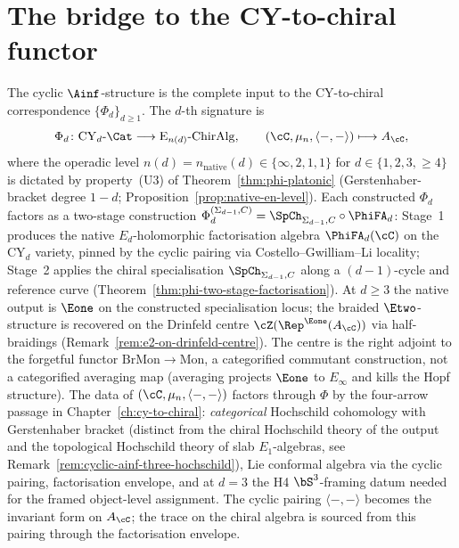 \section{The bridge to the CY-to-chiral functor}
\label{sec:bridge-to-functor}

The cyclic $\Ainf$-structure is the complete input to the CY-to-chiral correspondence $\{\Phi_d\}_{d \geq 1}$. The $d$-th signature is
\[
 \Phi_d \colon \mathrm{CY}_d\text{-}\Cat \longrightarrow \mathrm{E}_{n(d)}\text{-}\mathrm{ChirAlg},
 \qquad (\cC, \mu_n, \langle-,-\rangle) \longmapsto A_\cC,
\]
where the operadic level $n(d) = n_{\mathrm{native}}(d) \in \{\infty, 2, 1, 1\}$ for $d \in \{1, 2, 3, \geq 4\}$ is dictated by property~\textup{(U3)} of Theorem~\textup{\ref{thm:phi-platonic}} (Gerstenhaber-bracket degree $1 - d$; Proposition~\ref{prop:native-en-level}). Each constructed $\Phi_d$ factors as a two-stage construction $\Phi_d^{(\Sigma_{d-1},C)} = \SpCh_{\Sigma_{d-1},C} \circ \PhiFA_d$: Stage~1 produces the native $E_d$-holomorphic factorisation algebra $\PhiFA_d(\cC)$ on the CY$_d$ variety, pinned by the cyclic pairing via Costello--Gwilliam--Li locality; Stage~2 applies the chiral specialisation $\SpCh_{\Sigma_{d-1},C}$ along a $(d-1)$-cycle and reference curve (Theorem~\ref{thm:phi-two-stage-factorisation}). At $d \geq 3$ the native output is $\Eone$ on the constructed specialisation locus; the braided $\Etwo$-structure is recovered on the Drinfeld centre $\cZ(\Rep^{\Eone}(A_\cC))$ via half-braidings (Remark~\ref{rem:e2-on-drinfeld-centre}). The centre is the right adjoint to the forgetful functor $\mathrm{BrMon} \to \mathrm{Mon}$, a categorified commutant construction, not a categorified averaging map (averaging projects $\Eone$ to $E_\infty$ and kills the Hopf structure). The data of $(\cC, \mu_n, \langle-,-\rangle)$ factors through $\Phi$ by the four-arrow passage in Chapter~\ref{ch:cy-to-chiral}: \emph{categorical} Hochschild cohomology with Gerstenhaber bracket (distinct from the chiral Hochschild theory of the output and the topological Hochschild theory of slab $E_1$-algebras, see Remark~\ref{rem:cyclic-ainf-three-hochschild}), Lie conformal algebra via the cyclic pairing, factorisation envelope, and at $d=3$ the H4 $\bS^3$-framing datum needed for the framed object-level assignment. The cyclic pairing $\langle-,-\rangle$ becomes the invariant form on $A_\cC$; the trace on the chiral algebra is sourced from this pairing through the factorisation envelope.

